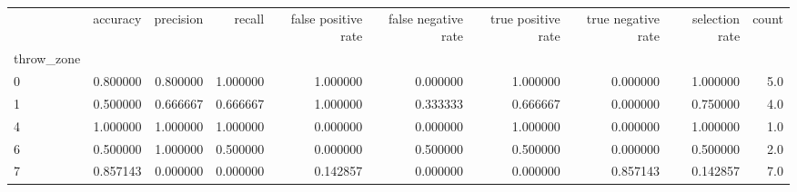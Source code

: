 \begin{tabular}{lrrrrrrrrr}
\toprule
{} &  accuracy &  precision &    recall &  false positive rate &  false negative rate &  true positive rate &  true negative rate &  selection rate &  count \\
throw\_zone &           &            &           &                      &                      &                     &                     &                 &        \\
\midrule
0          &  0.800000 &   0.800000 &  1.000000 &             1.000000 &             0.000000 &            1.000000 &            0.000000 &        1.000000 &    5.0 \\
1          &  0.500000 &   0.666667 &  0.666667 &             1.000000 &             0.333333 &            0.666667 &            0.000000 &        0.750000 &    4.0 \\
4          &  1.000000 &   1.000000 &  1.000000 &             0.000000 &             0.000000 &            1.000000 &            0.000000 &        1.000000 &    1.0 \\
6          &  0.500000 &   1.000000 &  0.500000 &             0.000000 &             0.500000 &            0.500000 &            0.000000 &        0.500000 &    2.0 \\
7          &  0.857143 &   0.000000 &  0.000000 &             0.142857 &             0.000000 &            0.000000 &            0.857143 &        0.142857 &    7.0 \\
\bottomrule
\end{tabular}
